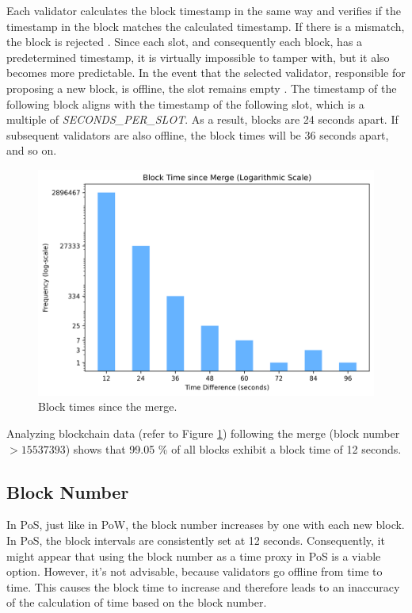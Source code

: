 Each validator calculates the block timestamp in the same way and verifies if
the timestamp in the block matches the calculated timestamp. If there is a
mismatch, the block is rejected \cite{process-execution-payload}. Since each
slot, and consequently each block, has a predetermined timestamp, it is
virtually impossible to tamper with, but it also becomes more predictable. In
the event that the selected validator, responsible for proposing a new block,
is offline, the slot remains empty \cite{validator-offline}. The timestamp of
the following block aligns with the timestamp of the following slot, which is a
multiple of \textit{SECONDS\_PER\_SLOT}. As a result, blocks are 24 seconds
apart. If subsequent validators are also offline, the block times will be 36
seconds apart, and so on.

\begin{figure}[H]
  \centering
  \includegraphics[width=1\textwidth]{block_time_analysis/pos_block_time_bar_chart.png}
  \caption{Block times since the merge.}
  \label{fig:block_time_analysis}
\end{figure}

Analyzing blockchain data (refer to Figure \ref{fig:block_time_analysis}) following the
merge (block number $> 15537393$) shows that 99.05 \% of all blocks exhibit a
block time of 12 seconds.

\subsection{Block Number}
In PoS, just like in PoW, the block number increases by one with each new block.
In PoS, the block intervals are consistently set at 12 seconds.
Consequently, it might appear that using the block number as a time proxy in PoS is a viable option. 
However, it's not advisable, because validators go offline from time to time.
This causes the block time to increase and therefore leads to an inaccuracy of the calculation
of time based on the block number.

